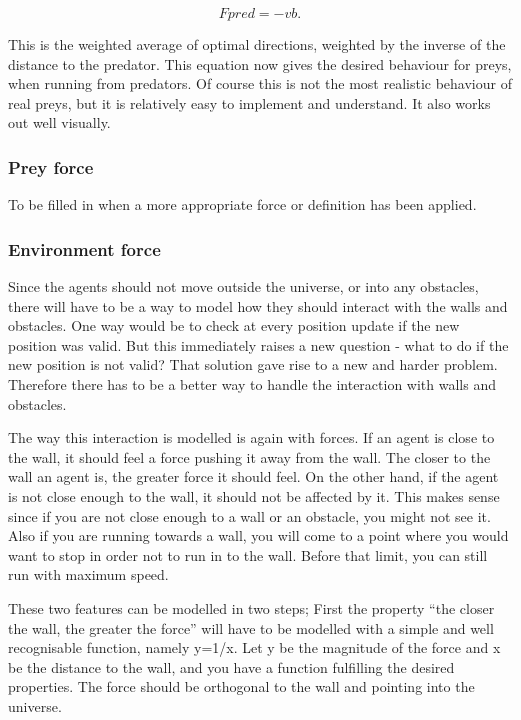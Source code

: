 \documentclass[paper=a4, fontsize=11pt,twoside]{scrartcl}		%
\begin{document}
\begin{flushleft}
$$Fpred = -vb.$$

This is the weighted average of optimal directions, weighted by the inverse of the distance to the predator. This equation now gives the desired behaviour for preys, when running from predators. Of course this is not the most realistic behaviour of real preys, but it is relatively easy to implement and understand. It also works out well visually. \newline

\subsubsection{Prey force}

To be filled in when a more appropriate force or definition has been applied.

\subsubsection{Environment force}

Since the agents should not move outside the universe, or into any obstacles, there will have to be a way to model how they should interact with the walls and obstacles. One way would be to check at every position update if the new position was valid. But this immediately raises a new question - what to do if the new position is not valid? That solution gave rise to a new and harder problem. Therefore there has to be a better way to handle the interaction with walls and obstacles. \newline

The way this interaction is modelled is again with forces. If an agent is close to the wall, it should feel a force pushing it away from the wall. The closer to the wall an agent is, the greater force it should feel. On the other hand, if the agent is not close enough to the wall, it should not be affected by it. This makes sense since if you are not close enough to a wall or an obstacle, you might not see it. Also if you are running towards a wall, you will come to a point where you would want to stop in order not to run in to the wall. Before that limit, you can still run with maximum speed. \newline

These two features can be modelled in two steps; First the property “the closer the wall, the greater the force” will have to be modelled with a simple and well recognisable function, namely y=1/x. Let y be the magnitude of the force and x be the distance to the wall, and you have a function fulfilling the desired properties. The force should be orthogonal to the wall and pointing into the universe. \newline


\end{flushleft}
\end{document}
